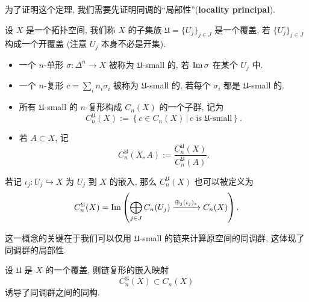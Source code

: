     为了证明这个定理, 
    我们需要先证明同调的“局部性”({\bf locality principal}).

    设 $X$ 是一个拓扑空间, 
    我们称 $X$ 的子集族 $\mathfrak{U}=\{U_j\}_{j\in J}$ 是一个覆盖, 
    若 $\{U_j^{\circ}\}_{j\in J}$ 构成一个开覆盖
    (注意 $U_j$ 本身不必是开集).

    \begin{definition}\hfill
        \begin{itemize}
            \item 一个 $n$-单形 $\sigma:\Delta^n\rightarrow X$ 
            被称为 $\mathfrak{U}$-small 的, 
            若 ${\rm Im}\,\sigma$ 在某个 $U_j$ 中.
            \item 一个 $n$-复形 $c=\sum_i{n_i\sigma_i}$ 
            被称为 $\mathfrak{U}$-small 的, 
            若每个 $\sigma_i$ 都是 $\mathfrak{U}$-small 的.
            \item 所有 $\mathfrak{U}$-small 的 $n$-复形构成 
            $C_n(X)$ 的一个子群, 记为
            \begin{equation*}
                C^{\mathfrak{U}}_n(X):=
                \left\{c\in C_n(X)\,\big|\,
                c \text{ is $\mathfrak{U}$-small}\right\}.
            \end{equation*}
            \item 若 $A\subset X$, 记
            \begin{equation*}
                C^{\mathfrak{U}}_n(X,A)
                :=\frac{C^{\mathfrak{U}}_n(X)}{C^{\mathfrak{U}}_n(A)}.
            \end{equation*}
        \end{itemize}
    \end{definition}

    若记 $\iota_j:U_j\hookrightarrow X$ 为 $U_j$ 到 $X$ 的嵌入, 那么 $C^{\mathfrak{U}}_n(X)$ 也可以被定义为
    \begin{equation*}
        C^{\mathfrak{U}}_n(X) = {\rm Im}\left(\bigoplus_{j\in J}C_n(U_j)\xrightarrow{\oplus_j (\iota_{j})_*}C_n(X)\right).
    \end{equation*}

    这一概念的关键在于我们可以仅用 $\mathfrak{U}$-small 的链来计算原空间的同调群, 这体现了同调群的局部性.

    \begin{theorem}\label{thm:small-chain}
        设 $\mathfrak{U}$ 是 $X$ 的一个覆盖, 则链复形的嵌入映射
        \begin{equation*}
            C^{\mathfrak{U}}_n(X)\subset C_n(X)
        \end{equation*}
        诱导了同调群之间的同构.
    \end{theorem}

